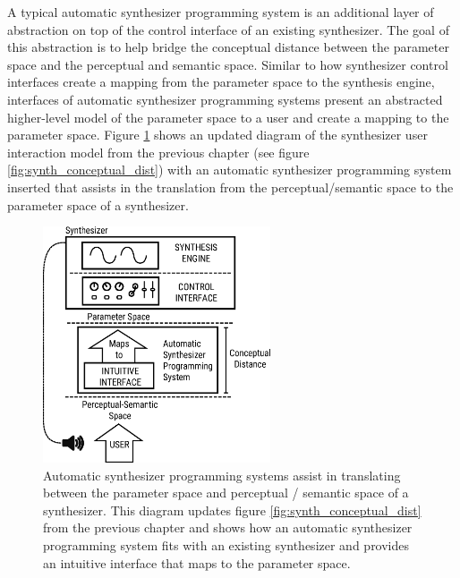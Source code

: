 \label{sec:asp-approaches}
A typical automatic synthesizer programming system is an additional layer of abstraction on top of the control interface of an existing synthesizer. The goal of this abstraction is to help bridge the conceptual distance between the parameter space and the perceptual and semantic space. Similar to how synthesizer control interfaces create a mapping from the parameter space to the synthesis engine, interfaces of automatic synthesizer programming systems present an abstracted higher-level model of the parameter space to a user and create a mapping to the parameter space. Figure \ref{fig:asp_bridge_the_gap} shows an updated diagram of the synthesizer user interaction model from the previous chapter (see figure \ref{fig:synth_conceptual_dist}) with an automatic synthesizer programming system inserted that assists in the translation from the perceptual/semantic space to the parameter space of a synthesizer.


\begin{figure}
    \centering
    \includegraphics[width=0.6\textwidth]{figures/background/asp_bridging_the_gap.eps}
    \caption{Automatic synthesizer programming systems assist in translating between the parameter space and perceptual / semantic space of a synthesizer. This diagram updates figure \ref{fig:synth_conceptual_dist} from the previous chapter and shows how an automatic synthesizer programming system fits with an existing synthesizer and provides an intuitive interface that maps to the parameter space.}
    \label{fig:asp_bridge_the_gap}
\end{figure}

